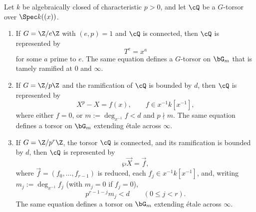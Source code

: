 \begin{lemma}
\label{lemma:realization_over_Gm}
\label{lemma:realization_over_Gm_Wr}
Let $k$ be algebraically closed of characteristic $p>0$, and let $\cQ$ be a
$G$-torsor over $\Spec k((x))$.
\begin{enumerate}
    \item If $G=\Z/e\Z$ with $(e,p)=1$ and $\cQ$ is connected, then
    $\cQ$ is represented by
    \[
    T^e=x^a
    \]
    for some $a$ prime to $e$. The same equation defines a $G$-torsor
    on $\bG_m$ that is tamely ramified at $0$ and $\infty$.

    \item If $G=\Z/p\Z$ and the ramification of $\cQ$ is bounded by $d$,
    then $\cQ$ is represented by
    \[
    X^p-X=f(x),\qquad f\in x^{-1}k[x^{-1}],
    \]
    where either $f=0$, or
    $m:=\deg_{x^{-1}}f<d$ and $p\nmid m$. The same equation defines a
    torsor on $\bG_m$ extending \'etale across $\infty$.

    \item If $G=\Z/p^r\Z$, the torsor $\cQ$ is connected, and its
    ramification is bounded by $d$, then $\cQ$ is represented by
    \[
    \wp\vec X=\vec f,
    \]
    where $\vec f=(f_0,\dots,f_{r-1})$ is reduced, each
    $f_j\in x^{-1}k[x^{-1}]$, and, writing
    $m_j:=\deg_{x^{-1}}f_j$ (with $m_j=0$ if $f_j=0$),
    \begin{equation}\label{eq:parallel_witt_pole_bound}
    p^{r-1-j}m_j<d\qquad(0\leq j<r).
    \end{equation}
    The same equation defines a torsor on $\bG_m$ extending \'etale across
    $\infty$.
\end{enumerate}
\end{lemma}

